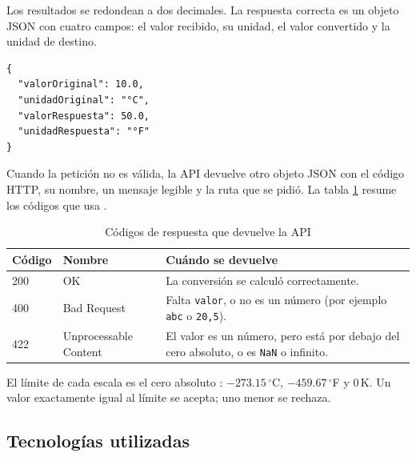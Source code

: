 \documentclass[10pt,a4paper]{article}
\newcommand{\gC}{\ensuremath{^{\circ}}C}
\newcommand{\gF}{\ensuremath{^{\circ}}F}
\begin{document}
Los resultados se redondean a dos decimales. La respuesta correcta es un objeto JSON con cuatro campos: el valor recibido, su unidad, el valor convertido y la unidad de destino.

\begin{lstlisting}[style=consola]
{
  "valorOriginal": 10.0,
  "unidadOriginal": "°C",
  "valorRespuesta": 50.0,
  "unidadRespuesta": "°F"
}
\end{lstlisting}

Cuando la petición no es válida, la API devuelve otro objeto JSON con el código HTTP, su nombre, un mensaje legible y la ruta que se pidió. La tabla \ref{tab:estados} resume los códigos que usa \cite{rfc9110}.

\begin{table}[H]
	\centering
	\small
	\begin{tabular}{l l p{9.2cm}}
		\toprule
		\textbf{Código} & \textbf{Nombre} & \textbf{Cuándo se devuelve} \\
		\midrule
		200 & OK & La conversión se calculó correctamente. \\
		400 & Bad Request & Falta \texttt{valor}, o no es un número (por ejemplo \texttt{abc} o \texttt{20,5}). \\
		422 & Unprocessable Content & El valor es un número, pero está por debajo del cero absoluto, o es \texttt{NaN} o infinito. \\
		\bottomrule
	\end{tabular}
	\caption{Códigos de respuesta que devuelve la API}
	\label{tab:estados}
\end{table}

El límite de cada escala es el cero absoluto \cite{bipm_si}: $-273.15$\,\gC{}, $-459.67$\,\gF{} y $0$\,K. Un valor exactamente igual al límite se acepta; uno menor se rechaza.

\subsection{Tecnologías utilizadas}
\end{document}
